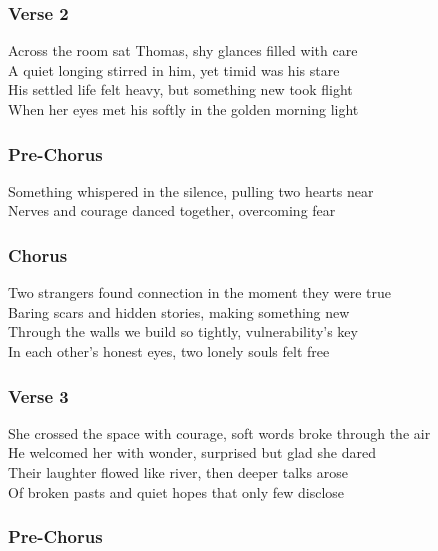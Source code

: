 \documentclass[]{article}
\begin{document}
\subsubsection{Verse 2}\label{verse-2-22}

Across the room sat Thomas, shy glances filled with care\\
A quiet longing stirred in him, yet timid was his stare\\
His settled life felt heavy, but something new took flight\\
When her eyes met his softly in the golden morning light

\subsubsection{Pre-Chorus}\label{pre-chorus-44}

Something whispered in the silence, pulling two hearts near\\
Nerves and courage danced together, overcoming fear

\subsubsection{Chorus}\label{chorus-76}

Two strangers found connection in the moment they were true\\
Baring scars and hidden stories, making something new\\
Through the walls we build so tightly, vulnerability's key\\
In each other's honest eyes, two lonely souls felt free

\subsubsection{Verse 3}\label{verse-3-12}

She crossed the space with courage, soft words broke through the air\\
He welcomed her with wonder, surprised but glad she dared\\
Their laughter flowed like river, then deeper talks arose\\
Of broken pasts and quiet hopes that only few disclose

\subsubsection{Pre-Chorus}\label{pre-chorus-45}
\end{document}
